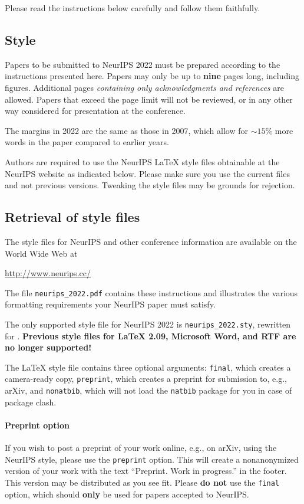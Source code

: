 \documentclass{article}
\begin{document}
Please read the instructions below carefully and follow them faithfully.

\subsection{Style}

Papers to be submitted to NeurIPS 2022 must be prepared according to the
instructions presented here. Papers may only be up to {\bf nine} pages long,
including figures. Additional pages \emph{containing only acknowledgments and
      references} are allowed. Papers that exceed the page limit will not be
reviewed, or in any other way considered for presentation at the conference.

The margins in 2022 are the same as those in 2007, which allow for $\sim$$15\%$
more words in the paper compared to earlier years.

Authors are required to use the NeurIPS \LaTeX{} style files obtainable at the
NeurIPS website as indicated below. Please make sure you use the current files
and not previous versions. Tweaking the style files may be grounds for
rejection.

\subsection{Retrieval of style files}

The style files for NeurIPS and other conference information are available on
the World Wide Web at
\begin{center}
      \url{http://www.neurips.cc/}
\end{center}
The file \verb+neurips_2022.pdf+ contains these instructions and illustrates the
various formatting requirements your NeurIPS paper must satisfy.

The only supported style file for NeurIPS 2022 is \verb+neurips_2022.sty+,
rewritten for \LaTeXe{}. \textbf{Previous style files for \LaTeX{} 2.09,
      Microsoft Word, and RTF are no longer supported!}

The \LaTeX{} style file contains three optional arguments: \verb+final+, which
creates a camera-ready copy, \verb+preprint+, which creates a preprint for
submission to, e.g., arXiv, and \verb+nonatbib+, which will not load the
\verb+natbib+ package for you in case of package clash.

\paragraph{Preprint option}
If you wish to post a preprint of your work online, e.g., on arXiv, using the
NeurIPS style, please use the \verb+preprint+ option. This will create a
nonanonymized version of your work with the text ``Preprint. Work in
progress.'' in the footer. This version may be distributed as you see fit.
Please \textbf{do not} use the \verb+final+ option, which should \textbf{only}
be used for papers accepted to NeurIPS.
\end{document}
